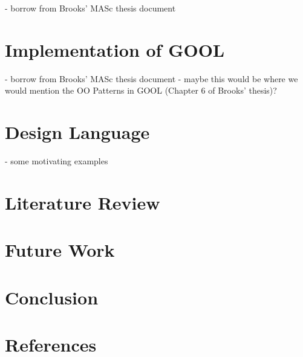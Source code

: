 \documentclass[review]{elsarticle}
\begin{document}
- borrow from Brooks’ MASc thesis document

\section{Implementation of GOOL}

- borrow from Brooks’ MASc thesis document
- maybe this would be where we would mention the OO Patterns in GOOL (Chapter 6
of Brooks’ thesis)?

\section{Design Language}

- some motivating examples

\section{Literature Review}

\section{Future Work}

\section{Conclusion}

\section*{References}


\end{document}
